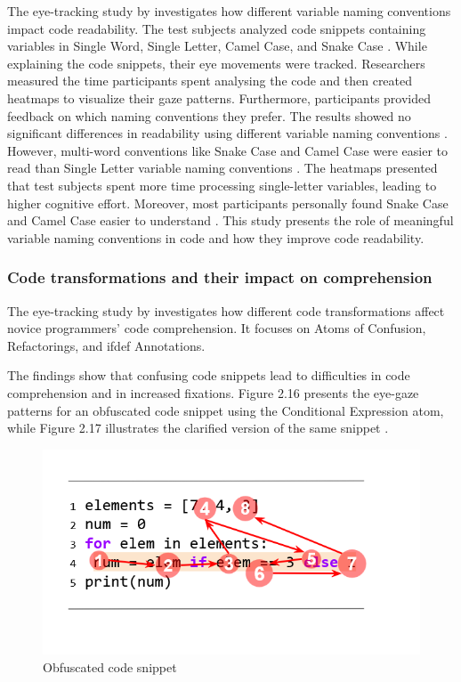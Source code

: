 The eye-tracking study by \citet{broberg2019using} investigates how different variable naming conventions impact code readability.  
The test subjects analyzed code snippets containing variables in Single Word, Single Letter, Camel Case, and Snake Case \cite{broberg2019using}. While explaining the code snippets, their eye movements were tracked. Researchers measured the time participants spent analysing the code and then created heatmaps to visualize their gaze patterns. Furthermore, participants provided feedback on which naming conventions they prefer. The results showed no significant differences in readability using different variable naming conventions \cite{broberg2019using}. However, multi-word conventions like Snake Case and Camel Case were easier to read than Single Letter variable naming conventions \cite{broberg2019using}. The heatmaps presented that test subjects spent more time processing single-letter variables, leading to higher cognitive effort. Moreover, most participants personally found Snake Case and Camel Case easier to understand \cite{broberg2019using}. 
This study presents the role of meaningful variable naming conventions in code and how they improve code readability.   

\subsubsection{Code transformations and their impact on comprehension}
The eye-tracking study by \citet{silva2023evaluating} investigates how different code transformations affect novice programmers’ code comprehension. It focuses on Atoms of Confusion, Refactorings, and ifdef Annotations. 

The findings show that confusing code snippets lead to difficulties in code comprehension and in increased fixations. Figure 2.16 presents the eye-gaze patterns for an obfuscated code snippet using the Conditional Expression atom, while Figure 2.17 illustrates the clarified version of the same snippet \cite{silva2023evaluating}. 
 

\begin{figure} [H]
  \centering
  \includegraphics[scale=0.8]{figures/a.png}
  \caption{Obfuscated code snippet \cite[p. 5]{silva2023evaluating}}
  \label{fig:AnhangsChor}
\end{figure}

